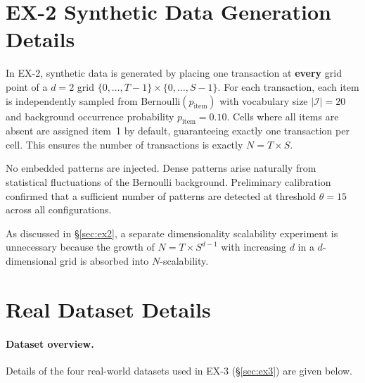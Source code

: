 \section{EX-2 Synthetic Data Generation Details}
\label{sec:ex2_data_details}

In EX-2, synthetic data is generated by placing
one transaction at \textbf{every} grid point of a $d = 2$ grid
$\{0,\ldots,T{-}1\} \times \{0,\ldots,S{-}1\}$.
For each transaction,
each item is independently sampled from
Bernoulli$(p_{\mathrm{item}})$ with
vocabulary size $|\mathcal{I}| = 20$ and
background occurrence probability $p_{\mathrm{item}} = 0.10$.
Cells where all items are absent
are assigned item~1 by default,
guaranteeing exactly one transaction per cell.
This ensures the number of transactions is exactly $N = T \times S$.

No embedded patterns are injected.
Dense patterns arise naturally from
statistical fluctuations of the Bernoulli background.
Preliminary calibration confirmed that
a sufficient number of patterns are detected
at threshold $\theta = 15$ across all configurations.

As discussed in \S\ref{sec:ex2},
a separate dimensionality scalability experiment
is unnecessary because the growth of $N = T \times S^{d-1}$
with increasing $d$ in a $d$-dimensional grid
is absorbed into $N$-scalability.

\section{Real Dataset Details}
\label{sec:real_data_qualitative}\label{sec:dataset_details}

\paragraph{Dataset overview.}
Details of the four real-world datasets used in EX-3 (\S\ref{sec:ex3}) are given below.


